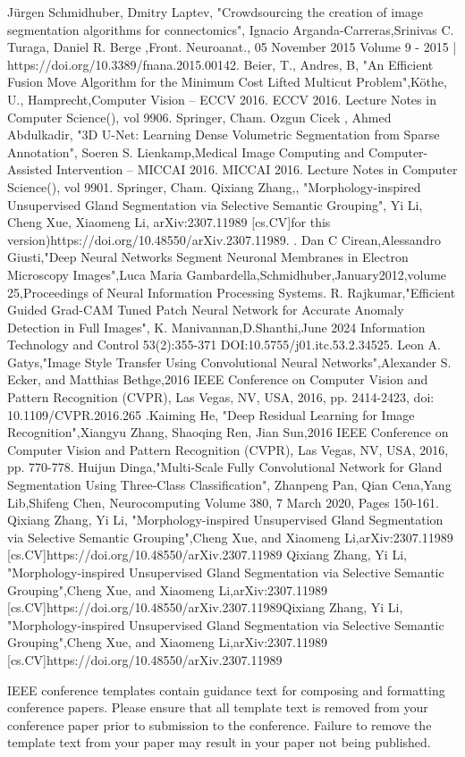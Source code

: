 \documentclass[conference]{IEEEtran}
\begin{document}
\begin{thebibliography}{00}
Jürgen Schmidhuber, Dmitry Laptev, "Crowdsourcing the creation of image segmentation algorithms for connectomics", Ignacio Arganda-Carreras,Srinivas C. Turaga, Daniel R. Berge ,Front. Neuroanat., 05 November 2015
Volume 9 - 2015 | https://doi.org/10.3389/fnana.2015.00142.
Beier, T., Andres, B, "An Efficient Fusion Move Algorithm for the Minimum Cost Lifted Multicut Problem",Köthe, U., Hamprecht,Computer Vision – ECCV 2016. ECCV 2016. Lecture Notes in Computer Science(), vol 9906. Springer, Cham.
Ozgun Cicek , Ahmed Abdulkadir, "3D U-Net: Learning Dense Volumetric Segmentation from Sparse Annotation", Soeren S. Lienkamp,Medical Image Computing and Computer-Assisted Intervention – MICCAI 2016. MICCAI 2016. Lecture Notes in Computer Science(), vol 9901. Springer, Cham.
Qixiang Zhang,, "Morphology-inspired Unsupervised Gland Segmentation via Selective Semantic Grouping", Yi Li, Cheng Xue, Xiaomeng Li,	arXiv:2307.11989 [cs.CV]for this version)https://doi.org/10.48550/arXiv.2307.11989.
.
Dan C Cirean,Alessandro Giusti,"Deep Neural Networks Segment Neuronal Membranes in Electron Microscopy Images",Luca Maria Gambardella,Schmidhuber,{January}{2012},volume {25},{Proceedings of Neural Information Processing Systems}.
R. Rajkumar,"Efficient Guided Grad-CAM Tuned Patch Neural Network for Accurate 
Anomaly Detection in Full Images", K. Manivannan,D.Shanthi,June 2024 Information Technology and Control 53(2):355-371
DOI:10.5755/j01.itc.53.2.34525.
Leon A. Gatys,"Image Style Transfer Using Convolutional Neural Networks",Alexander S. Ecker, and Matthias Bethge,2016 IEEE Conference on Computer Vision and Pattern Recognition (CVPR), Las Vegas, NV, USA, 2016, pp. 2414-2423, doi: 10.1109/CVPR.2016.265
.Kaiming He, "Deep Residual Learning for Image Recognition",Xiangyu Zhang, Shaoqing Ren, Jian Sun,2016 IEEE Conference on Computer Vision and Pattern Recognition (CVPR), Las Vegas, NV, USA, 2016, pp. 770-778.
Huijun Dinga,"Multi-Scale Fully Convolutional Network for Gland Segmentation Using Three-Class Classification", Zhanpeng Pan, Qian Cena,Yang Lib,Shifeng Chen, Neurocomputing Volume 380, 7 March 2020, Pages 150-161.
Qixiang Zhang, Yi Li, "Morphology-inspired Unsupervised Gland Segmentation via Selective Semantic Grouping",Cheng Xue, and Xiaomeng Li,arXiv:2307.11989 [cs.CV]https://doi.org/10.48550/arXiv.2307.11989
Qixiang Zhang, Yi Li, "Morphology-inspired Unsupervised Gland Segmentation via Selective Semantic Grouping",Cheng Xue, and Xiaomeng Li,arXiv:2307.11989 [cs.CV]https://doi.org/10.48550/arXiv.2307.11989Qixiang Zhang, Yi Li, "Morphology-inspired Unsupervised Gland Segmentation via Selective Semantic Grouping",Cheng Xue, and Xiaomeng Li,arXiv:2307.11989 [cs.CV]https://doi.org/10.48550/arXiv.2307.11989
\end{thebibliography}
\vspace{12pt}
\color{red}
IEEE conference templates contain guidance text for composing and formatting conference papers. Please ensure that all template text is removed from your conference paper prior to submission to the conference. Failure to remove the template text from your paper may result in your paper not being published.
\end{document}
